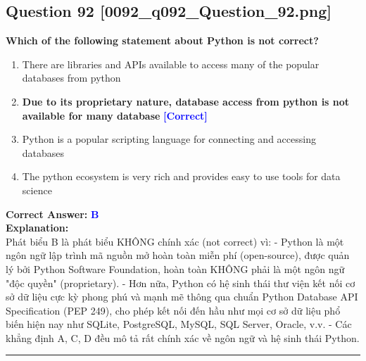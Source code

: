 \documentclass[11pt,a4paper]{article}
\begin{document}
\begin{minipage}{\textwidth}
\subsection*{Question 92 \quad \footnotesize{[0092_q092_Question_92.png]}}
\noindent \textbf{Which of the following statement about Python is not correct?}

\begin{enumerate}[label=\Alph*.]
    \item There are libraries and APIs available to access many of the popular databases from python
    \item \textbf{Due to its proprietary nature, database access from python is not available for many database} \hfill \textcolor{blue}{\textbf{[Correct]}}
    \item Python is a popular scripting language for connecting and accessing databases
    \item The python ecosystem is very rich and provides easy to use tools for data science
\end{enumerate}

\noindent \textbf{Correct Answer:} \textcolor{blue}{\textbf{B}} \\[4pt]
\noindent \textbf{Explanation:}\\
Phát biểu B là phát biểu KHÔNG chính xác (not correct) vì:\newline
- Python là một ngôn ngữ lập trình mã nguồn mở hoàn toàn miễn phí (open-source), được quản lý bởi Python Software Foundation, hoàn toàn KHÔNG phải là một ngôn ngữ "độc quyền" (proprietary).\newline
- Hơn nữa, Python có hệ sinh thái thư viện kết nối cơ sở dữ liệu cực kỳ phong phú và mạnh mẽ thông qua chuẩn Python Database API Specification (PEP 249), cho phép kết nối đến hầu như mọi cơ sở dữ liệu phổ biến hiện nay như SQLite, PostgreSQL, MySQL, SQL Server, Oracle, v.v.\newline
- Các khẳng định A, C, D đều mô tả rất chính xác về ngôn ngữ và hệ sinh thái Python.
\end{minipage}
\vspace{0.8cm}
\hrule
\vspace{0.5cm}
\end{document}
